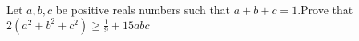 Let $a,b,c$ be positive reals numbers such that $a+b+c=1$.Prove that $2(a^2+b^2+c^2)\ge \frac{1}{9}+15abc$
